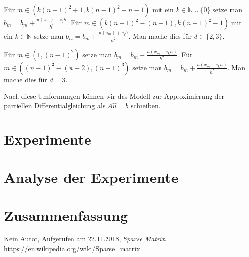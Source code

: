 \documentclass[smallheadings]{scrartcl}
\begin{document}
Für $m \in (k(n-1)^2+1, k(n-1)^2+n-1)$ mit ein $k \in \mathbb{N}\cup \{0\}$ setze man $b_m = b_m + \frac{u(x_m)-e_jh}{h^2}$. Für $m \in (k(n-1)^2-(n-1), k(n-1)^2-1)$ mit ein $k \in \mathbb{N}$ setze man $b_m = b_m + \frac{u(x_m)+e_jh}{h^2}$.  Man mache dies für $d\in \{2, 3\}$.

Für $m\in (1, (n-1)^2)$ setze man $b_m = b_m + \frac{u(x_m-e_kh)}{h^2}$. Für $m\in ((n-1)^3-(n-2), (n-1)^3)$ setze man $b_m = b_m + \frac{u(x_m+e_kh)}{h^2}$.  Man mache dies für $d=3$.

Nach diese Umformungen können wir das Modell zur Approximierung der partiellen Differentialgleichung als $A\hat{u}=b$ schreiben.

\section{Experimente}



\section{Analyse der Experimente}



\section{Zusammenfassung}




\begin{thebibliography}{9}
 Kein Autor, Aufgerufen am 22.11.2018, \textit{Sparse Matrix}. 
\url{https://en.wikipedia.org/wiki/Sparse_matrix}
\end{thebibliography}


\end{document}
